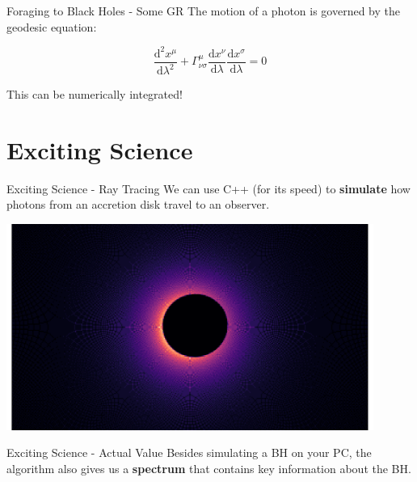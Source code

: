\documentclass{beamer}
\begin{document}
\begin{frame}{Foraging to Black Holes - Some GR}
    The motion of a photon is governed by the geodesic equation:

    \vspace{0.5cm}

    \begin{equation*}
        \frac{\mathrm{d}^{2}x^{\mu}}{\mathrm{d}\lambda^{2}} + \Gamma^{\mu}_{\nu\sigma}\frac{\mathrm{d}x^{\nu}}{\mathrm{d}\lambda}\frac{\mathrm{d}x^{\sigma}}{\mathrm{d}\lambda} = 0
    \end{equation*}

    \vspace{0.5cm}

    This can be numerically integrated!
\end{frame}


\section{Exciting Science}


\begin{frame}{Exciting Science - Ray Tracing}
    We can use C++ (for its speed) to \textbf{simulate} how photons from an accretion disk travel to an observer.

    \vspace{0.5cm}

    \centering
    \includegraphics[width=0.90\textwidth]{asset/bh_alt.png}

\end{frame}


\begin{frame}{Exciting Science - Actual Value}
    Besides simulating a BH on your PC, the algorithm also gives us a \textbf{spectrum} that contains key information about the BH.
\end{frame}
\end{document}
